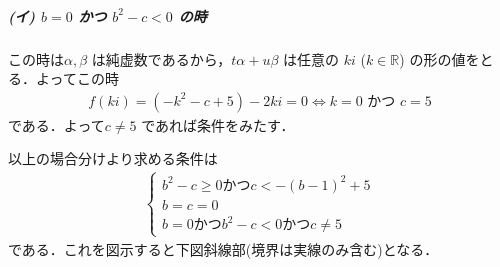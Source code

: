 \documentclass[../../main.tex]{subfiles}
\begin{document}
\subparagraph{(イ) $b = 0$ かつ $b^2 - c < 0$ の時}

この時は$\alpha, \beta$ は純虚数であるから，$t\alpha + u\beta$ は任意の $ki$ ($k \in \mathbb{R}$) の形の値をとる．よってこの時
\begin{align}
  f(ki) = (-k^2 - c + 5) - 2ki = 0 \iff k = 0 \text{ かつ } c = 5
\end{align}
である．よって$c \neq 5$ であれば条件をみたす．
\casesend

以上の場合分けより求める条件は
\begin{align}
  \begin{cases}
    b^2 - c \ge 0 \text{かつ} c < -(b-1)^2 + 5 \\
    b=c=0 \\
    b = 0 \text{かつ} b^2 - c < 0 \text{かつ} c \neq 5
  \end{cases}
\end{align}
である．これを図示すると下図斜線部(境界は実線のみ含む)となる．
\end{document}
